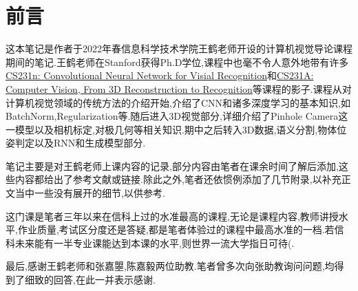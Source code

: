 \section*{前言}
这本笔记是作者于2022年春信息科学技术学院王鹤老师开设的计算机视觉导论课程期间的笔记.王鹤老师在Stanford获得Ph.D学位,课程中也毫不令人意外地带有许多\href{https://cs231n.github.io/}{CS231n: Convolutional Neural Network for Visial Recognition}和\href{https://web.stanford.edu/class/cs231a/course_notes.html}{CS231A: Computer Vision, From 3D Reconstruction to Recognition}等课程的影子.课程从对计算机视觉领域的传统方法的介绍开始,介绍了CNN和诸多深度学习的基本知识,如BatchNorm,Regularization等.随后进入3D视觉部分,详细介绍了Pinhole Camera这一模型以及相机标定,对极几何等相关知识.期中之后转入3D数据,语义分割,物体位姿判定以及RNN和生成模型部分.

笔记主要是对王鹤老师上课内容的记录,部分内容由笔者在课余时间了解后添加,这些内容都给出了参考文献或链接.除此之外,笔者还依惯例添加了几节附录,以补充正文当中一些没有展开的细节,以供参考.

这门课是笔者三年以来在信科上过的水准最高的课程,无论是课程内容,教师讲授水平,作业质量,考试区分度还是答疑,都是笔者体验过的课程中最高水准的一档.若信科未来能有一半专业课能达到本课的水平,则世界一流大学指日可待(.

最后,感谢王鹤老师和张嘉曌,陈嘉毅两位助教.笔者曾多次向张助教询问问题,均得到了细致的回答,在此一并表示感谢.

